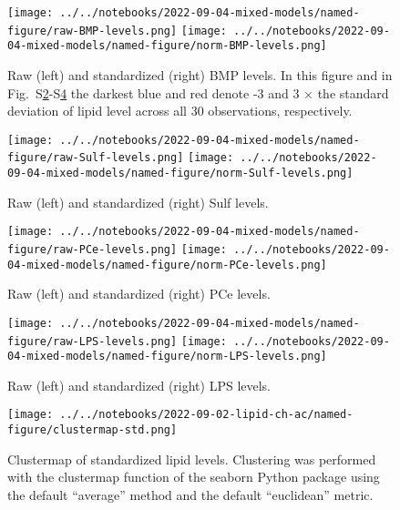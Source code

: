 \documentclass[letterpaper]{article}
\begin{document}
\setcounter{figure}{0}
\makeatletter 
\renewcommand{\figurename}{Supplementary Figure} %
\makeatother

\begin{figure}[p]
	\texttt{[image: ../../notebooks/2022-09-04-mixed-models/named-figure/raw-BMP-levels.png]}
	\texttt{[image: ../../notebooks/2022-09-04-mixed-models/named-figure/norm-BMP-levels.png]}
	\caption[Raw and standardized BMP levels]{
	Raw (left) and standardized (right) BMP levels.  In this figure and in
	Fig.~S\ref{fig:heatmap-Sulf}-S\ref{fig:heatmap-LPS}
	the darkest blue and red denote -3 and 3 $\times$ the standard deviation of
	lipid level across all 30 observations, respectively.
}
\label{fig:heatmap-BMP}
\end{figure}

\begin{figure}[p]
	\texttt{[image: ../../notebooks/2022-09-04-mixed-models/named-figure/raw-Sulf-levels.png]}
	\texttt{[image: ../../notebooks/2022-09-04-mixed-models/named-figure/norm-Sulf-levels.png]}
	\caption[Raw and standardized Sulf levels]{
	Raw (left) and standardized (right) Sulf levels.  
}
\label{fig:heatmap-Sulf}
\end{figure}

\begin{figure}[p]
	\texttt{[image: ../../notebooks/2022-09-04-mixed-models/named-figure/raw-PCe-levels.png]}
	\texttt{[image: ../../notebooks/2022-09-04-mixed-models/named-figure/norm-PCe-levels.png]}
	\caption[Raw and standardized PCe levels]{
	Raw (left) and standardized (right) PCe levels.  
}
\label{fig:heatmap-PCe}
\end{figure}

\begin{figure}[p]
	\texttt{[image: ../../notebooks/2022-09-04-mixed-models/named-figure/raw-LPS-levels.png]}
	\texttt{[image: ../../notebooks/2022-09-04-mixed-models/named-figure/norm-LPS-levels.png]}
	\caption[Raw and standardized LPS levels]{
	Raw (left) and standardized (right) LPS levels.  
}
\label{fig:heatmap-LPS}
\end{figure}

\begin{figure}[p]
	\texttt{[image: ../../notebooks/2022-09-02-lipid-ch-ac/named-figure/clustermap-std.png]}
	\caption[Clustermap of standardized lipid levels]{
	Clustermap of standardized lipid levels.  Clustering was performed with the
	clustermap function of the seaborn Python package using the default
	``average'' method and the default ``euclidean'' metric.
}
\label{fig:clustermap}
\end{figure}
\end{document}
